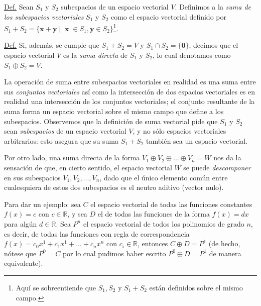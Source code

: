 \documentclass[12pt]{article}
\begin{document}
\begin{tcolorbox}
\underline{Def.} Sean $S_1$ y $S_2$ subespacios de un espacio vectorial $V$. Definimos a la \emph{suma de los subespacios vectoriales} $S_1$ y $S_2$ como el espacio vectorial definido por $S_1+S_2=\{\mathbf{x}+\mathbf{y}\mathop|\mathop \mathbf{x}\in S_1, \mathbf{y}\in S_2\}$\footnote{Aquí se sobreentiende que $S_1, S_2$ y $S_1+S_2$ están definidos sobre el mismo campo.}.

\vspace{3mm}

\underline{Def.} Si, además, se cumple que $S_1+S_2=V$ y $S_1 \cap S_2 = \{\mathbf{0}\}$, decimos que el espacio vectorial $V$ es la \emph{suma directa} de $S_1$ y $S_2$, lo cual denotamos como $S_1\oplus S_2=V$.
\end{tcolorbox}

La operación de suma entre subespacios vectoriales en realidad es una suma entre sus \emph{conjuntos vectoriales} \textemdash así como la intersección de dos espacios vectoriales es en realidad una intersección de los conjuntos vectoriales\textemdash; el conjunto resultante de la suma forma un espacio vectorial sobre el mismo campo que define a los subespacios. Observemos que la definición de suma vectorial pide que $S_1$ y $S_2$ sean \emph{subespacios} de un espacio vectorial $V$, y no sólo espacios vectoriales arbitrarios: esto asegura que su suma $S_1+S_2$ también sea un espacio vectorial.

Por otro lado, una suma directa de la forma $V_1\oplus V_2\oplus...\oplus V_n=W$ nos da la sensación de que, en cierto sentido, el espacio vectorial $W$ se puede \emph{descomponer} en sus subespacios $V_1, V_2,...,V_n$, dado que el único elemento común entre cualesquiera de estos dos subespacios es el neutro aditivo (vector nulo).

\vspace{3mm}

Para dar un ejemplo: sea $C$ el espacio vectorial de todas las funciones constantes $f(x) = c$ con $c\in\mathbb{R}$, y sea $D$ el de todas las funciones de la forma $f(x) = d x$ para algún $d\in\mathbb{R}$. Sea $P^n$ el espacio vectorial de todos los polinomios de grado $n$, es decir, de todas las funciones con regla de correspondencia $f(x) = c_0 x^1 + c_1 x^1 + ... + c_n x^n$ con $c_i\in\mathbb{R}$, entonces $C\oplus D = P^1$ (de hecho, nótese que $P^0=C$ por lo cual pudimos haber escrito $P^0\oplus D=P^1$ de manera equivalente).

\vspace{3mm}
\end{document}

